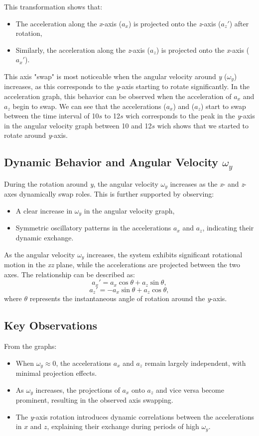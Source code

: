 \documentclass[12pt]{article}
\begin{document}
This transformation shows that:
\begin{itemize}
    \item The acceleration along the \textit{x}-axis (\(a_x\)) is projected onto the \textit{z}-axis (\(a_z'\)) after rotation,
    \item Similarly, the acceleration along the \textit{z}-axis (\(a_z\)) is projected onto the \textit{x}-axis (\(a_x'\)).
\end{itemize}

This axis "swap" is most noticeable when the angular velocity around \textit{y} (\(\omega_y\)) increases, as this corresponds to the \textit{y}-axis starting to rotate significantly. In the acceleration graph, this behavior can be observed when the acceleration of \(a_x\) and \(a_z\) begin to swap.
We can see that the accelerations (\(a_x\)) and (\(a_z\)) start to swap between the time interval of 10$s$ to 12$s$ wich corresponds to the peak in the \textit{y}-axis in the angular velocity graph between 10 and 12$s$ wich shows that we started to rotate around \textit{y}-axis.

\subsection*{Dynamic Behavior and Angular Velocity \(\omega_y\)}
During the rotation around \textit{y}, the angular velocity \(\omega_y\) increases as the \textit{x}- and \textit{z}-axes dynamically swap roles. This is further supported by observing:
\begin{itemize}
    \item A clear increase in \(\omega_y\) in the angular velocity graph,
    \item Symmetric oscillatory patterns in the accelerations \(a_x\) and \(a_z\), indicating their dynamic exchange.
\end{itemize}

As the angular velocity \(\omega_y\) increases, the system exhibits significant rotational motion in the \textit{xz} plane, while the accelerations are projected between the two axes. The relationship can be described as:
\[
a_x' = a_x \cos\theta + a_z \sin\theta,
\]
\[
a_z' = -a_x \sin\theta + a_z \cos\theta,
\]
where \(\theta\) represents the instantaneous angle of rotation around the \textit{y}-axis.

\subsection*{Key Observations}
From the graphs:
\begin{itemize}
    \item When \(\omega_y \approx 0\), the accelerations \(a_x\) and \(a_z\) remain largely independent, with minimal projection effects.
    \item As \(\omega_y\) increases, the projections of \(a_x\) onto \(a_z\) and vice versa become prominent, resulting in the observed axis swapping.
    \item The \textit{y}-axis rotation introduces dynamic correlations between the accelerations in \(x\) and \(z\), explaining their exchange during periods of high \(\omega_y\).
\end{itemize}
\end{document}
